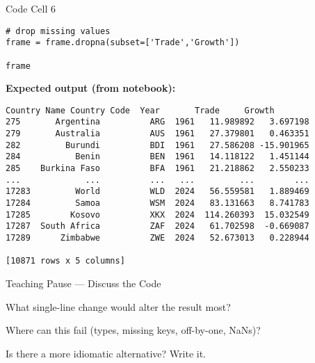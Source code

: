 \documentclass[notes,11pt, aspectratio=169, xcolor=table]{beamer}
\newenvironment{wideitemize}{\itemize\addtolength{\itemsep}{10pt}}{\enditemize}
\begin{document}
\begin{frame}[fragile]{Code Cell 6}
\begin{verbatim}
# drop missing values
frame = frame.dropna(subset=['Trade','Growth'])

frame
\end{verbatim}
\vspace{0.5ex}
\textbf{Expected output (from notebook):}
\begin{verbatim}
Country Name Country Code  Year       Trade     Growth
275       Argentina          ARG  1961   11.989892   3.697198
279       Australia          AUS  1961   27.379801   0.463351
282         Burundi          BDI  1961   27.586208 -15.901965
284           Benin          BEN  1961   14.118122   1.451144
285    Burkina Faso          BFA  1961   21.218862   2.550233
...             ...          ...   ...         ...        ...
17283         World          WLD  2024   56.559581   1.889469
17284         Samoa          WSM  2024   83.131663   8.741783
17285        Kosovo          XKX  2024  114.260393  15.032549
17287  South Africa          ZAF  2024   61.702598  -0.669087
17289      Zimbabwe          ZWE  2024   52.673013   0.228944

[10871 rows x 5 columns]
\end{verbatim}
\end{frame}

\begin{frame}{Teaching Pause — Discuss the Code}
\begin{wideitemize}
\item What single-line change would alter the result most?
\item Where can this fail (types, missing keys, off-by-one, NaNs)?
\item Is there a more idiomatic alternative? Write it.
\end{wideitemize}
\end{frame}
\end{document}
